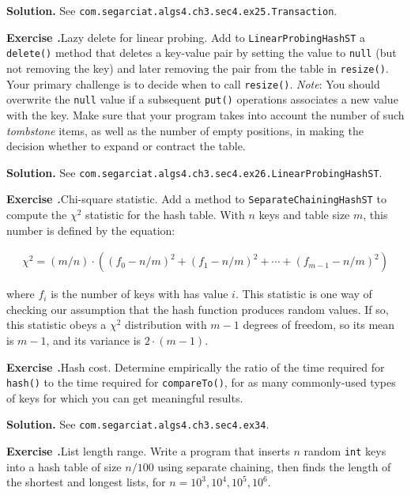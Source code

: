 \documentclass[12pt, a4paper]{article}
\newenvironment{ex}[2][Exercise]
{\par\medskip\noindent \textbf{#1 #2.}}
{\medskip}
\newenvironment{sol}[1][Solution]
{\par\medskip\noindent \textbf{#1.} }
{\medskip}
\begin{document}
	\begin{sol}
		See \texttt{com.segarciat.algs4.ch3.sec4.ex25.Transaction}.
	\end{sol}
	\begin{ex}{26}
		\emph{Lazy delete for linear probing}. Add to \texttt{LinearProbingHashST} a
		\texttt{delete()} method that deletes a key-value pair by setting the value to
		\texttt{null} (but not removing the key) and later removing the pair from the
		table in \texttt{resize()}. Your primary challenge is to decide when to call
		\texttt{resize()}. \emph{Note}: You should overwrite the \texttt{null} value if
		a subsequent \texttt{put()} operations associates a new value with the key.
		Make sure that your program takes into account the number of such \emph{tombstone}
		items, as well as the number of empty positions, in making
		the decision whether to expand or contract the table.
	\end{ex}
	\begin{sol}
		See \texttt{com.segarciat.algs4.ch3.sec4.ex26.LinearProbingHashST}.
	\end{sol}
	\begin{ex}{30}
		\emph{Chi-square statistic}. Add a method to \texttt{SeparateChainingHashST} to compute the
		$\chi^2$ statistic for the hash table. With $n$ keys and table size $m$, this
		number is defined by the equation:
		
		\begin{align*}
		\chi^2 = (m/n) \cdot ((f_0 - n/m)^2 + (f_1 - n/m)^2 + \cdots + (f_{m-1} - n/m)^2)
		\end{align*}
		
		where $f_i$ is the number of keys with has value $i$. This statistic is one way of
		checking our assumption that the hash function produces random values. If so, this
		statistic obeys a $\chi^2$ distribution with $m-1$ degrees of freedom, so its mean
		is $m-1$, and its variance is $2\cdot (m-1)$.
	\end{ex}
	\begin{ex}{34}
		\emph{Hash cost}. Determine empirically the ratio of the time required for \texttt{hash()}
		to the time required for \texttt{compareTo()}, for as many commonly-used types of
		keys for which you can get meaningful results.
	\end{ex}
	\begin{sol}
		See \texttt{com.segarciat.algs4.ch3.sec4.ex34}.
	\end{sol}
	\begin{ex}{36}
		\emph{List length range}. Write a program that inserts $n$ random \texttt{int} keys into
		a hash table of size $n / 100$ using separate chaining, then finds the length
		of the shortest and longest lists, for $n=10^3,10^4,10^5,10^6$.
	\end{ex}
\end{document}
